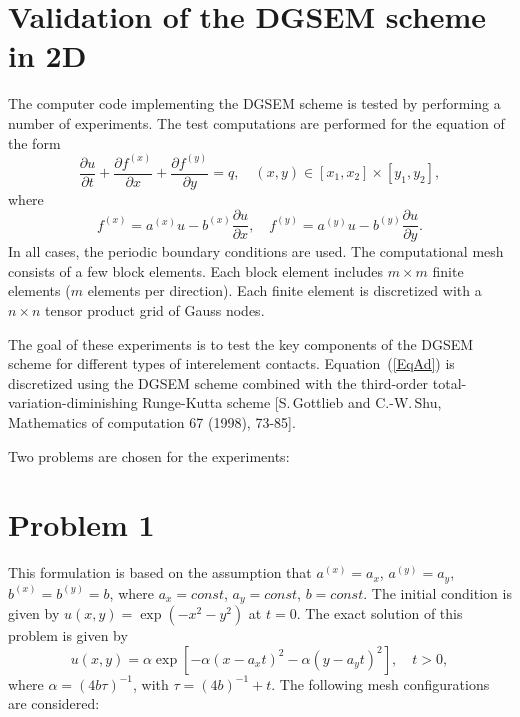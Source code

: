 \documentclass[fleqn]{article}
\begin{document}
\section*{Validation of the DGSEM scheme in 2D}
The computer code implementing the DGSEM scheme is tested by performing a number of experiments. The test computations are performed for the equation of the form
\begin{equation}
\label{EqAd}
\frac{\partial u}{\partial t}+\frac{\partial f^{(x)}}{\partial x}+\frac{\partial f^{(y)}}{\partial y}=q, \quad (x,y) \in [x_{1},x_{2}] \times [y_{1},y_{2}],
\end{equation}
where
\begin{equation}
f^{(x)}=a^{(x)}u-b^{(x)}\frac{\partial u}{\partial x}, \quad
f^{(y)}=a^{(y)}u-b^{(y)}\frac{\partial u}{\partial y}.
\end{equation}
In all cases, the periodic boundary conditions are used. The computational mesh consists of a few block elements. Each block element includes $m \times m$ finite elements ($m$ elements per direction). Each finite element is discretized with a $n \times n$ tensor product grid of Gauss nodes.

The goal of these experiments is to test the key components of the DGSEM scheme for different types of interelement contacts. Equation~(\ref{EqAd}) is discretized using the DGSEM scheme combined with the third-order total-variation-diminishing Runge-Kutta scheme [S.\,Gottlieb and C.-W.\,Shu, Mathematics of computation 67 (1998), 73-85].

Two problems are chosen for the experiments:
\section{Problem 1}
This formulation is based on the assumption that $a^{(x)} = a_{x}$, $a^{(y)}=a_{y}$, $b^{(x)}=b^{(y)}=b$, where $a_{x}=const$, $a_{y}=const$, $b=const$.  The initial condition is given by $u(x,y)=\exp (-x^{2}-y^{2} )$ at $t=0$.  The exact solution of this problem is given by
\begin{displaymath}
u(x,y)=\alpha \exp\left[-\alpha \left(x-a_{x}t\right)^{2}-\alpha \left(y-a_{y}t\right)^{2} \right], \quad t>0,
\end{displaymath}
where $\alpha=(4 b \tau)^{-1}$, with $\tau=(4b)^{-1}+t$.  The following mesh configurations are considered: \\
\end{document}

